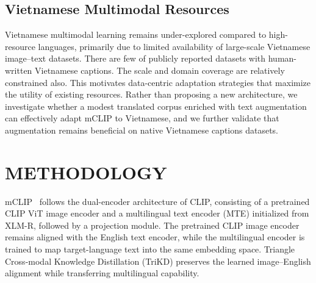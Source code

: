 \subsection{Vietnamese Multimodal Resources}
Vietnamese multimodal learning remains under-explored compared to high-resource languages, primarily due to limited availability of large-scale Vietnamese image--text datasets. There are few of publicly reported datasets with human-written Vietnamese captions. The scale and domain coverage are relatively constrained also. This motivates data-centric adaptation strategies that maximize the utility of existing resources. Rather than proposing a new architecture, we investigate whether a modest translated corpus enriched with text augmentation can effectively adapt mCLIP\cite{chen-etal-2023-mclip} to Vietnamese, and we further validate that augmentation remains beneficial on native Vietnamese captions datasets.


\section{METHODOLOGY}
\label{sec:method}

mCLIP~\cite{chen-etal-2023-mclip} follows the dual-encoder architecture of CLIP, consisting of a pretrained CLIP ViT image encoder and a multilingual text encoder (MTE) initialized from XLM-R, followed by a projection module. The pretrained CLIP image encoder remains aligned with the English text encoder, while the multilingual encoder is trained to map target-language text into the same embedding space. Triangle Cross-modal Knowledge Distillation (TriKD) preserves the learned image–English alignment while transferring multilingual capability.


